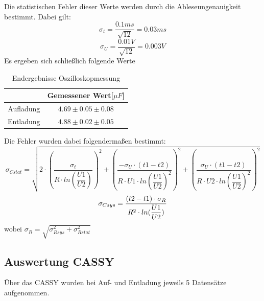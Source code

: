 \documentclass[12pt,a4paper]{article}
\begin{document}
Die statistischen Fehler dieser Werte werden durch die Ableseungenauigkeit bestimmt. Dabei gilt:
\begin{equation}
\sigma_t = \dfrac{0.1ms}{\sqrt{12}} = 0.03ms
\end{equation}
\begin{equation}
\sigma_U = \dfrac{0.01V}{\sqrt{12}} = 0.003V
\end{equation}
Es ergeben sich schließlich folgende Werte
\begin{table}[H]
\begin{center}
\begin{tabular}{|c|c|}
\hline 
 & Gemessener Wert[$\mu F$] \\ 
\hline 
Aufladung & $4.69\pm 0.05\pm 0.08$ \\ 
\hline 
Entladung & $4.88\pm 0.02\pm 0.05$ \\ 
\hline 
\end{tabular} 
\end{center}
\caption{Endergebnisse Oszilloskopmessung}
\end{table}
Die Fehler wurden dabei folgendermaßen bestimmt:
\begin{equation}
\sigma_{Cstat} = \sqrt{2\cdot\left(\dfrac{\sigma_t}{R\cdot ln(\dfrac{U1}{U2})}\right)^{2}+\left(\dfrac{-\sigma_U\cdot(t1-t2)}{R\cdot U1\cdot ln(\dfrac{U1}{U2})^{2}}\right)^{2}+\left(\dfrac{\sigma_U\cdot(t1-t2)}{R\cdot U2\cdot ln(\dfrac{U1}{U2})^{2}}\right)^{2}}
\end{equation}
\begin{equation}
\sigma_{Csys} = \dfrac{(t2-t1)\cdot \sigma_R}{R^{2}\cdot ln(\dfrac{U1}{U2})}\medskip
\end{equation}
wobei $\sigma_{R} = \sqrt{\sigma_{Rsys}^2+\sigma_{Rstat}^2}$

\subsection{Auswertung CASSY}
Über das CASSY wurden bei Auf- und Entladung jeweils 5 Datensätze aufgenommen.
\end{document}
